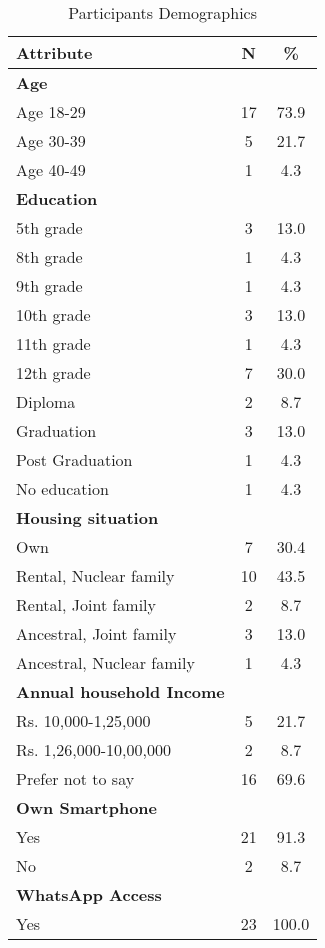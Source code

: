 \begin{table}[htp]
\caption{Participants Demographics}
\begin{center}
\begin{tabular}{|l|c|c|}
\hline

\textbf{Attribute} & \textbf{N}& \textbf{\%} \\
\hline


    \textbf{Age} & & \\
    Age 18-29 & 17 & 73.9 \\
    Age 30-39 & 5 & 21.7 \\
    Age 40-49 & 1 & 4.3 \\   
\hline
    \textbf{Education} & & \\
    5th grade & 3 & 13.0 \\
    8th grade & 1 & 4.3 \\
    9th grade & 1 & 4.3 \\
    10th grade & 3 & 13.0 \\
    11th grade & 1 & 4.3 \\
    12th grade & 7 & 30.0 \\
    Diploma & 2 & 8.7 \\
    Graduation & 3 & 13.0 \\
    Post Graduation & 1 & 4.3 \\
    No education & 1 & 4.3 \\
  \hline
    \textbf{Housing situation} & & \\
    Own & 7 & 30.4 \\
    Rental, Nuclear family & 10 & 43.5 \\
    Rental, Joint family & 2 & 8.7 \\
    Ancestral, Joint family & 3 & 13.0 \\
    Ancestral, Nuclear family & 1 & 4.3 \\
  \hline
    \textbf{Annual household Income} & & \\
    Rs. 10,000-1,25,000 & 5 & 21.7 \\
    Rs. 1,26,000-10,00,000 & 2 & 8.7 \\
    Prefer not to say & 16 & 69.6 \\
\hline
    \textbf{Own Smartphone} & & \\
    Yes & 21 & 91.3 \\
    No & 2 & 8.7 \\
  \hline
    \textbf{WhatsApp Access} & & \\
    Yes & 23 & 100.0 \\
  \hline
\end{tabular}
\label{tab:demo}
\end{center}

\end{table}





